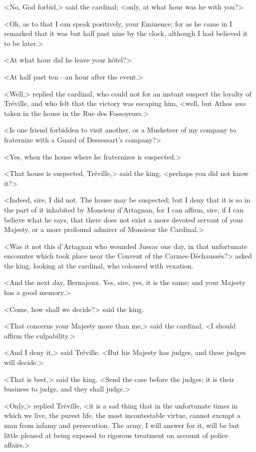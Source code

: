<No, God forbid,> said the cardinal; <only, at what hour was he with you?> 

<Oh, as to that I can speak positively, your Eminence; for as he came in I remarked that it was but half past nine by the clock, although I had believed it to be later.> 

<At what hour did he leave your hôtel?> 

<At half past ten---an hour after the event.> 

<Well,> replied the cardinal, who could not for an instant suspect the loyalty of Tréville, and who felt that the victory was escaping him, <well, but Athos \textit{was} taken in the house in the Rue des Fossoyeurs.> 

<Is one friend forbidden to visit another, or a Musketeer of my company to fraternize with a Guard of Dessessart's company?> 

<Yes, when the house where he fraternizes is suspected.> 

<That house is suspected, Tréville,> said the king; <perhaps you did not know it?> 

<Indeed, sire, I did not. The house may be suspected; but I deny that it is so in the part of it inhabited by Monsieur d'Artagnan, for I can affirm, sire, if I can believe what he says, that there does not exist a more devoted servant of your Majesty, or a more profound admirer of Monsieur the Cardinal.> 

<Was it not this d'Artagnan who wounded Jussac one day, in that unfortunate encounter which took place near the Convent of the Carmes-Déchaussés?> asked the king, looking at the cardinal, who coloured with vexation. 

<And the next day, Bernajoux. Yes, sire, yes, it is the same; and your Majesty has a good memory.> 

<Come, how shall we decide?> said the king. 

<That concerns your Majesty more than me,> said the cardinal. <I should affirm the culpability.> 

<And I deny it,> said Tréville. <But his Majesty has judges, and these judges will decide.> 

<That is best,> said the king. <Send the case before the judges; it is their business to judge, and they shall judge.> 

<Only,> replied Tréville, <it is a sad thing that in the unfortunate times in which we live, the purest life, the most incontestable virtue, cannot exempt a man from infamy and persecution. The army, I will answer for it, will be but little pleased at being exposed to rigorous treatment on account of police affairs.> 

